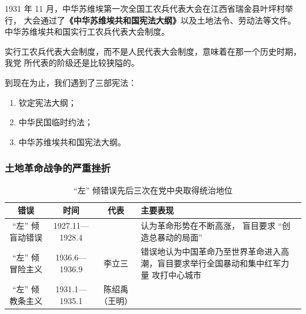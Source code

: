 \documentclass[10pt, UTF8]{book} %
\begin{document}
1931 年 11 月，中华苏维埃第一次全国工农兵代表大会在江西省瑞金县叶坪村举行，
大会通过了\textbf{《中华苏维埃共和国宪法大纲》}以及土地法令、劳动法等文件。
中华苏维埃共和国实行工农兵代表大会制度。
\begin{remark}
    实行工农兵代表大会制度，而不是人民代表大会制度，意味着在那一个历史时期，我党
    所代表的阶级还是比较狭隘的。
\end{remark}

\begin{mdframed}[frametitle={《中国近现代史纲要》课程中出现的宪法}]
    到现在为止，我们遇到了三部宪法：
    \begin{enumerate}[label={\arabic*.}, itemsep=0pt]
        \item 钦定宪法大纲；
        \item 中华民国临时约法；
        \item 中华苏维埃共和国宪法大纲。
    \end{enumerate}
\end{mdframed}

\subsubsection{土地革命战争的严重挫折}

\begin{table}[H]
    \centering
    \caption{“左” 倾错误先后三次在党中央取得统治地位}
    \begin{tabular}{c c c p{}}
        \hline 
        错误 & 时间 & 代表 & 主要表现 \\
        \hline 
        “左” 倾盲动错误 & 1927.11—1928.4 & & 认为革命形势在不断高涨，
        盲目要求 “创造总暴动的局面” \\ 
        “左” 倾冒险主义 & 1936.6—1936.9 & 李立三 & 
        错误地认为中国革命乃至世界革命进入高潮，盲目要求举行全国暴动和集中红军力量
        攻打中心城市 \\ 
        “左” 倾教条主义 & 1931.1—1935.1 & 陈绍禹（王明） &  \\ 
        \hline
    \end{tabular}
\end{table}
\end{document}
